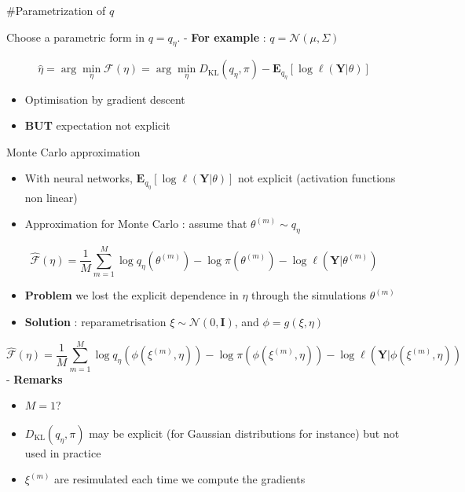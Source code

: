 \documentclass[
  ignorenonframetext,
]{beamer}
\providecommand{\tightlist}{%
  \setlength{\itemsep}{0pt}\setlength{\parskip}{0pt}}
\begin{document}
\begin{frame}
\#Parametrization of \(q\)

Choose a parametric form in \(q = q_{\eta}\). - \textbf{For example} :
\(q = \mathcal{N}(\mu,\Sigma)\)

\[\hat{\eta} = \arg\min_{\eta} \mathcal{F}(\eta) = \arg\min_{\eta} D_{\text{KL}}(q_{\eta},\pi) - \mathbf{E}_{q_{\eta}}[\log \ell(\mathbf{Y}|\theta)]\]

\begin{itemize}
\item
  Optimisation by gradient descent
\item
  \textbf{BUT} expectation not explicit
\end{itemize}
\end{frame}

\begin{frame}{Monte Carlo approximation}
\protect\hypertarget{monte-carlo-approximation}{}
\begin{itemize}
\item
  With neural networks,
  \(\mathbf{E}_{q_{\eta}}[\log \ell(\mathbf{Y}|\theta)]\) not explicit
  (activation functions non linear)
\item
  Approximation for Monte Carlo : assume that
  \(\theta^{(m)} \sim q_{\eta}\)
\end{itemize}

\[\widehat{\mathcal{F}}(\eta) = \frac{1}{M}\sum_{m=1}^M  \log q_{\eta}(\theta ^{(m)}) - \log \pi(\theta^{(m)}) -  \log \ell(\mathbf{Y}|\theta^{(m)})\]

\begin{itemize}
\item
  \textbf{Problem} we lost the explicit dependence in \(\eta\) through
  the simulations \(\theta^{(m)}\)
\item
  \textbf{Solution} : reparametrisation
  \(\xi\sim \mathcal{N}(0,\mathbf{I})\), and \(\phi = g(\xi,\eta)\)
\end{itemize}

\[\widehat{\mathcal{F}}(\eta) = \frac{1}{M}\sum_{m=1}^M   \log q_{\eta}(\phi(\xi^{(m)},\eta)) - \log \pi(\phi(\xi^{(m)},\eta)) - \log \ell(\mathbf{Y}| \phi(\xi^{(m)},\eta))\]
- \textbf{Remarks}

\begin{itemize}
\tightlist
\item
  \(M=1\)?
\item
  \(D_{\text{KL}}(q_{\eta},\pi)\) may be explicit (for Gaussian
  distributions for instance) but not used in practice
\item
  \(\xi^{(m)}\) are resimulated each time we compute the gradients
\end{itemize}
\end{frame}
\end{document}
